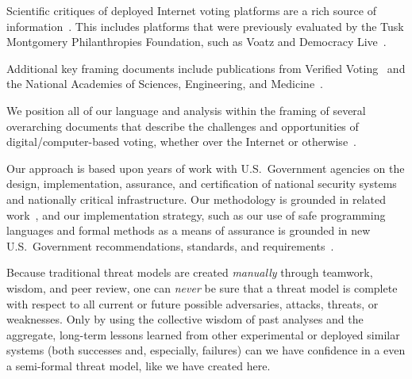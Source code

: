 \documentclass[10pt,letterpaper]{article}
\begin{document}
Scientific critiques of deployed Internet voting platforms are a rich source of information~\cite{KiniryFormallyCountingElectronic2007,KiniryKOARemoteVoting2007,WolchokAttackingWashingtonDC2012,TeagueProblemsiVoteInternet2012,HaldermanNewSouthWales2015a,SpringallSecurityAnalysisEstonian2014}. This includes platforms that were previously evaluated by the Tusk Montgomery Philanthropies Foundation, such as Voatz and Democracy Live~\cite{TrailofBitsVoatzSecurityAssessment2020,TrailofBitsVoatzSecurityAssessment2020a,SpecterEtAlBallotBusted2020,SpecterSecurityAnalysisDemocracy2021}.

Additional key framing documents include publications from Verified Voting~\cite{VerifiedVotingCastingVotesSafely2023,VerifiedVotingInternet} and the National Academies of Sciences, Engineering, and Medicine~\cite{CommitteeontheFutureofVoting:AccessibleReliableVerifiableTechnologySecuringVoteProtecting2018}.

We position all of our language and analysis within the framing of several overarching documents that describe the challenges and opportunities of digital/computer-based voting, whether over the Internet or otherwise~\cite{Dzieduszycka-SuinatFutureVotingEndtoEnd2015a,U.S.ElectionAssistanceCommissionVoluntaryVoting2021}.

Our approach is based upon years of work with U.S.~Government agencies on the design, implementation, assurance, and certification of national security systems and nationally critical infrastructure. Our methodology is grounded in related work~\cite{PeterLoscoccoAssumptionDrivenDesignStrategy}, and our implementation strategy, such as our use of safe programming languages and formal methods as a means of assurance is grounded in new U.S.~Government recommendations, standards, and requirements~\cite{OfficeoftheNationalCyberDirector:TheWhiteHouseBackBuilding2024,UnitedStatesCybersecurityandInfrastructureSecurityAgencyEtAlCaseMemory2023,DefenseScienceBoardTaskForceUndersecretaryofDefenseforResearchandEngineeringFutureCyberWarfighting2024,DefenseScienceBoardTaskForceUndersecretaryofDefenseforResearchandEngineeringSecureElectronicProcessing2025,DefenseScienceBoardTaskForceUndersecretaryofDefenseforResearchandEngineeringTestEvaluationTE2024,TheWhiteHouseSummary2023Request2024,CybersecurityandInfrastructureSecurityAgencyCISAEtAlShiftingBalance}.

Because traditional threat models are created \emph{manually} through teamwork, wisdom, and peer review, one can \emph{never} be sure that a threat model is complete with respect to all current or future possible adversaries, attacks, threats, or weaknesses. Only by using the collective wisdom of past analyses and the aggregate, long-term lessons learned from other experimental or deployed similar systems (both successes and, especially, failures) can we have confidence in a even a semi-formal threat model, like we have created here.
\end{document}
